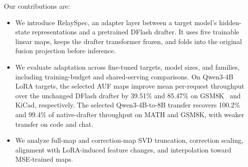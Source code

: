 Our contributions are:
\begin{itemize}
    \item We introduce RelaySpec, an adapter layer between a target model's hidden-state representations and a pretrained DFlash drafter. It uses five trainable linear maps, keeps the drafter transformer frozen, and folds into the original fusion projection before inference.
    \item We evaluate adaptation across fine-tuned targets, model sizes, and families, including training-budget and shared-serving comparisons. On Qwen3-4B LoRA targets, the selected AUF maps improve mean per-request throughput over the unchanged DFlash drafter by 39.51\% and 85.47\% on GSM8K~\citep{cobbe2021gsm8k} and KiCad, respectively. The selected Qwen3-4B-to-8B transfer recovers 100.2\% and 99.4\% of native-drafter throughput on MATH and GSM8K, with weaker transfer on code and chat.
    \item We analyze full-map and correction-map SVD truncation, correction scaling, alignment with LoRA-induced feature changes, and interpolation toward MSE-trained maps.
\end{itemize}
